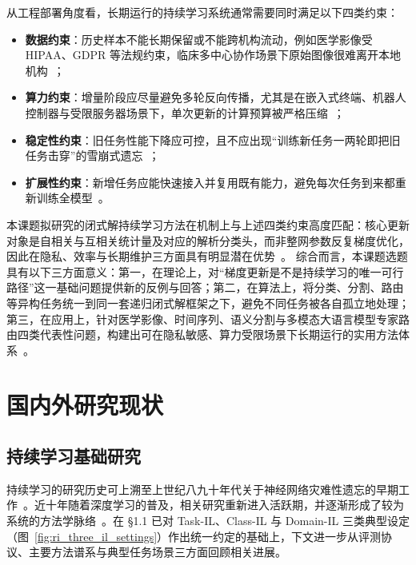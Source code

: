 从工程部署角度看，长期运行的持续学习系统通常需要同时满足以下四类约束：
\begin{itemize}
    \item \textbf{数据约束}：历史样本不能长期保留或不能跨机构流动，例如医学影像受 HIPAA、GDPR 等法规约束，临床多中心协作场景下原始图像很难离开本地机构~\citep{yang2023medmnist,derakhshani2022lifelonger}；
    \item \textbf{算力约束}：增量阶段应尽量避免多轮反向传播，尤其是在嵌入式终端、机器人控制器与受限服务器场景下，单次更新的计算预算被严格压缩~\citep{de2021continual,GKEAL_Zhuang_CVPR2023}；
    \item \textbf{稳定性约束}：旧任务性能下降应可控，且不应出现“训练新任务一两轮即把旧任务击穿”的雪崩式遗忘~\citep{goodfellow2013catastrophic,wang2024survey}；
    \item \textbf{扩展性约束}：新增任务应能快速接入并复用既有能力，避免每次任务到来都重新训练全模型~\citep{rusu2016progressive,wang2022dualprompt}。
\end{itemize}

本课题拟研究的闭式解持续学习方法在机制上与上述四类约束高度匹配：核心更新对象是自相关与互相关统计量及对应的解析分类头，而非整网参数反复梯度优化，因此在隐私、效率与长期维护三方面具有明显潜在优势~\citep{zhuang2022acil,fang2024air}。
综合而言，本课题选题具有以下三方面意义：第一，在理论上，对“梯度更新是不是持续学习的唯一可行路径”这一基础问题提供新的反例与回答；第二，在算法上，将分类、分割、路由等异构任务统一到同一套递归闭式解框架之下，避免不同任务被各自孤立地处理；第三，在应用上，针对医学影像、时间序列、语义分割与多模态大语言模型专家路由四类代表性问题，构建出可在隐私敏感、算力受限场景下长期运行的实用方法体系~\citep{li2026aidc,li2025tsacl,li2025cfsseg,li2026cfrouter}。

\section{国内外研究现状}

\subsection{持续学习基础研究}

持续学习的研究历史可上溯至上世纪八九十年代关于神经网络灾难性遗忘的早期工作~\citep{mccloskey1989catastrophic,goodfellow2013catastrophic}。近十年随着深度学习的普及，相关研究重新进入活跃期，并逐渐形成了较为系统的方法学脉络~\citep{wang2024survey,zhou2024class,zhou2023cil_survey_zh,wang2025llm_cl_zh,leo2024survey}。在 §1.1 已对 Task-IL、Class-IL 与 Domain-IL 三类典型设定（图~\ref{fig:ri_three_il_settings}）作出统一约定的基础上，下文进一步从评测协议、主要方法谱系与典型任务场景三方面回顾相关进展。

